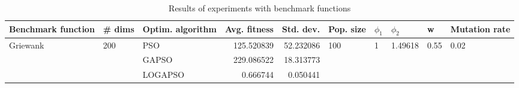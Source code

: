 \begin{table}
\centering
\caption{Results of experiments with benchmark functions}
\begin{tabular}{lllrrlllll}
\toprule
       Benchmark function &              \# dims & Optim. algorithm &  Avg. fitness &  Std. dev. &            Pop. size &         $\phi_{1}$ &               $\phi_{2}$ &                     w &         Mutation rate \\
\midrule
\multirow{3}{*}{Griewank} & \multirow{3}{*}{200} &              PSO &    125.520839 &  52.232086 & \multirow{3}{*}{100} & \multirow{3}{*}{1} & \multirow{3}{*}{1.49618} & \multirow{3}{*}{0.55} & \multirow{3}{*}{0.02} \\
                          &                      &            GAPSO &    229.086522 &  18.313773 &                      &                    &                          &                       &                       \\
                          &                      &          LOGAPSO &      0.666744 &   0.050441 &                      &                    &                          &                       &                       \\
\bottomrule
\end{tabular}
\end{table}
